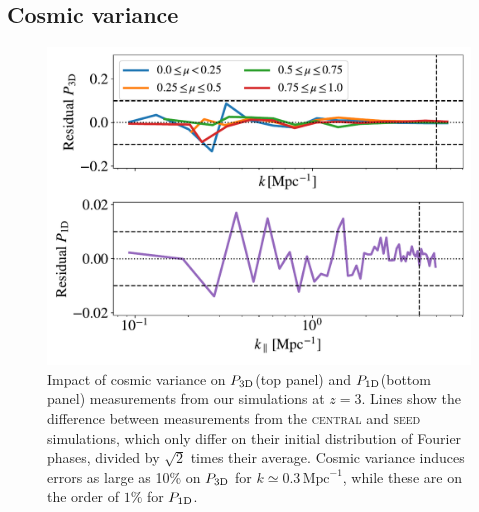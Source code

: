 \documentclass[longauth]{aa}
\newcommand{\poned}{\ensuremath{P_{\rm 1D}}\xspace}
\newcommand{\pthreed}{\ensuremath{P_{\rm 3D}}\xspace}
\newcommand{\simseed}{\textsc{seed}\xspace}
\newcommand{\simcentral}{\textsc{central}\xspace}
\newcommand{\iMpc}{\ensuremath{\,\mathrm{Mpc}^{-1}}}
\begin{document}
\begin{appendix}


\section{Cosmic variance}
\label{sec:cosmic_variance}

\begin{figure}
    \centering\includegraphics[width=\columnwidth]{figures/cvariance_z_3.0.pdf}
    \caption{Impact of cosmic variance on \pthreed (top panel) and \poned (bottom panel) measurements from our simulations at $z=3$. Lines show the difference between measurements from the \simcentral and \simseed simulations, which only differ on their initial distribution of Fourier phases, divided by $\sqrt{2}$ times their average. Cosmic variance induces errors as large as 10\% on \pthreed for $k\simeq0.3\iMpc$, while these are on the order of $1\%$ for \poned.}
    \label{fig:cvar}
\end{figure}



\end{appendix}
\end{document}
